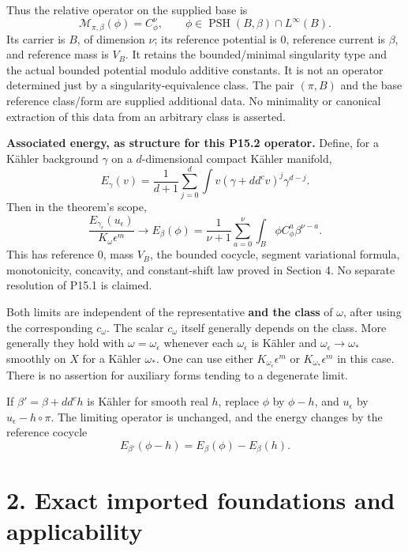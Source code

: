 \documentclass[
  11pt,
]{article}
\begin{document}
Thus the relative operator on the supplied base is \[
\mathcal{M}_{\pi,\beta}(\phi)=C_\phi^\nu,
\qquad \phi\in\operatorname{PSH}(B,\beta)\cap L^\infty(B).
\] Its carrier is \(B\), of dimension \(\nu\); its reference potential is \(0\), reference current is \(\beta\), and reference mass is \(V_B\). It retains the bounded/minimal singularity type and the actual bounded potential modulo additive constants. It is not an operator determined just by a singularity-equivalence class. The pair \((\pi,B)\) and the base reference class/form are supplied additional data. No minimality or canonical extraction of this data from an arbitrary class is asserted.

\textbf{Associated energy, as structure for this P15.2 operator.} Define, for a Kähler background \(\gamma\) on a \(d\)-dimensional compact Kähler manifold, \[
E_\gamma(v)=\frac1{d+1}\sum_{j=0}^d
\int v(\gamma+dd^c v)^j\gamma^{d-j}.
\] Then in the theorem's scope, \[
\frac{E_{\gamma_\epsilon}(u_\epsilon)}{K_\omega\epsilon^m}
\longrightarrow
E_\beta(\phi)=\frac1{\nu+1}\sum_{a=0}^{\nu}
\int_B\phi C_\phi^a\beta^{\nu-a}.                                  \tag{2}
\] This has reference \(0\), mass \(V_B\), the bounded cocycle, segment variational formula, monotonicity, concavity, and constant-shift law proved in Section 4. No separate resolution of P15.1 is claimed.

Both limits are independent of the representative \textbf{and the class} of \(\omega\), after using the corresponding \(c_\omega\). The scalar \(c_\omega\) itself generally depends on the class. More generally they hold with \(\omega=\omega_\epsilon\) whenever each \(\omega_\epsilon\) is Kähler and \(\omega_\epsilon\to\omega_*\) smoothly on \(X\) for a Kähler \(\omega_*\). One can use either \(K_{\omega_\epsilon}\epsilon^m\) or \(K_{\omega_*}\epsilon^m\) in this case. There is no assertion for auxiliary forms tending to a degenerate limit.

If \(\beta'=\beta+dd^c h\) is Kähler for smooth real \(h\), replace \(\phi\) by \(\phi-h\), and \(u_\epsilon\) by \(u_\epsilon-h\circ\pi\). The limiting operator is unchanged, and the energy changes by the reference cocycle \[
E_{\beta'}(\phi-h)=E_\beta(\phi)-E_\beta(h).                           \tag{3}
\]

\section{2. Exact imported foundations and applicability}\label{exact-imported-foundations-and-applicability}
\end{document}
